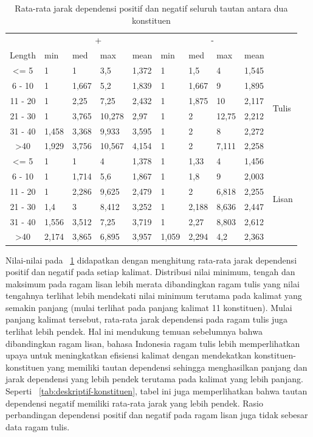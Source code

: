 \documentclass[10pt, a4paper, conference, compsocconf]{IEEEtran}
\begin{document}
\begin{table}
\begin{center}
\caption{Rata-rata jarak dependensi positif dan negatif seluruh tautan antara dua konstituen}  \label{tab:deskriptif-mdd}
\begin{tabular}{c l l l l l l l l l}
\hline
 & \multicolumn{4}{c}{+} & \multicolumn{4}{c}{-} & \\  \cline{2-9}  
Length & min 	& med	& max 	& mean 	& min 	& med 	& max 	& mean 	& \\ \cline{1-10}  
\textless= 5 	& 1 		& 1 		& 3,5	 	& 1,372 	& 1 		& 1,5 	& 4	 	& 1,545 	&\multirow{6}{*}{Tulis}\\
6 - 10 		& 1 		& 1,667	& 5,2 	& 1,839 	& 1 		& 1,667 	& 9	 	& 1,895 	& 	\\
11 - 20 		& 1 		& 2,25 	& 7,25 	& 2,432 	& 1 		& 1,875 	& 10	 	& 2,117 	& 	\\
21 - 30 		& 1 		& 3,765 	& 10,278 	& 2,97 	& 1 		& 2 		& 12,75	& 2,212 	& 	\\ 
31 - 40 		& 1,458 	& 3,368 	& 9,933	& 3,595 	& 1 		& 2 		& 8		& 2,272 	& 	\\
\textgreater 40 	& 1,929 	& 3,756	& 10,567 	& 4,154 	& 1 		& 2 		& 7,111	& 2,258 	& 	\\ 
\hline
\textless= 5 	& 1 		& 1 		& 4	 	& 1,378 	& 1 		& 1,33 	& 4		& 1,456 	& \multirow{6}{*}{Lisan}\\
6 - 10 		& 1 		& 1,714	& 5,6 	& 1,867 	& 1 		& 1,8		& 9		& 2,003 	& \\
11 - 20 		& 1 		& 2,286 	& 9,625 	& 2,479 	& 1 		& 2 		& 6,818	& 2,255 	& \\
21 - 30 		& 1,4 	& 3	 	& 8,412 	& 3,252	& 1 		& 2,188	& 8,636	& 2,447 	& \\ 
31 - 40 		& 1,556 	& 3,512 	& 7,25	& 3,719 	& 1 		& 2,27	& 8,803	& 2,612 	& \\
\textgreater 40 	& 2,174 	& 3,865	& 6,895 	& 3,957 	& 1,059 	& 2,294	& 4,2		& 2,363 	& \\ 
\hline
   \end{tabular}
\end{center}
\end{table}

Nilai-nilai pada \tab~\ref{tab:deskriptif-mdd} didapatkan dengan menghitung rata-rata jarak dependensi positif dan negatif pada setiap kalimat. Distribusi nilai minimum, tengah dan maksimum pada ragam lisan lebih merata dibandingkan ragam tulis yang nilai tengahnya terlihat lebih mendekati nilai minimum terutama pada kalimat yang semakin panjang (mulai terlihat pada panjang kalimat 11 konstituen). Mulai panjang kalimat tersebut, rata-rata jarak dependensi pada ragam tulis juga terlihat lebih pendek. Hal ini mendukung temuan sebelumnya bahwa dibandingkan ragam lisan, bahasa Indonesia ragam tulis lebih memperlihatkan upaya untuk meningkatkan efisiensi kalimat dengan mendekatkan konstituen-konstituen yang memiliki tautan dependensi sehingga menghasilkan panjang dan jarak dependensi yang lebih pendek terutama pada kalimat yang lebih panjang. Seperti \tab~\ref{tab:deskriptif-konstituen}, tabel ini juga memperlihatkan bahwa tautan dependensi negatif memiliki rata-rata jarak yang lebih pendek. Rasio perbandingan dependensi positif dan negatif pada ragam lisan juga tidak sebesar data ragam tulis. 
\end{document}
